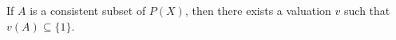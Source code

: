 If $A$ is a consistent subset of $P(X)$, then there exists a valuation $v$ such that $v(A) \subseteq \{1\}$.
